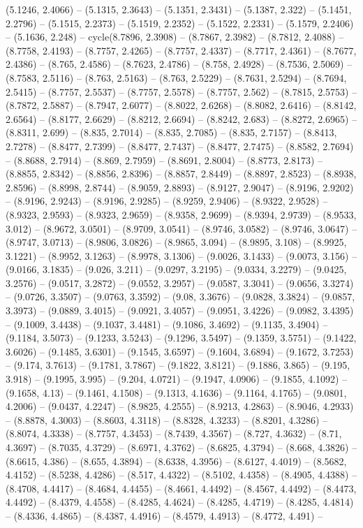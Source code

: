 (5.1246, 2.4066) -- (5.1315, 2.3643) -- (5.1351, 2.3431) -- (5.1387, 2.322) -- (5.1451, 2.2796) -- (5.1515, 2.2373) -- (5.1519, 2.2352) -- (5.1522, 2.2331) -- (5.1579, 2.2406) -- (5.1636, 2.248) -- cycle(8.7896, 2.3908) -- (8.7867, 2.3982) -- (8.7812, 2.4088) -- (8.7758, 2.4193) -- (8.7757, 2.4265) -- (8.7757, 2.4337) -- (8.7717, 2.4361) -- (8.7677, 2.4386) -- (8.765, 2.4586) -- (8.7623, 2.4786) -- (8.758, 2.4928) -- (8.7536, 2.5069) -- (8.7583, 2.5116) -- (8.763, 2.5163) -- (8.763, 2.5229) -- (8.7631, 2.5294) -- (8.7694, 2.5415) -- (8.7757, 2.5537) -- (8.7757, 2.5578) -- (8.7757, 2.562) -- (8.7815, 2.5753) -- (8.7872, 2.5887) -- (8.7947, 2.6077) -- (8.8022, 2.6268) -- (8.8082, 2.6416) -- (8.8142, 2.6564) -- (8.8177, 2.6629) -- (8.8212, 2.6694) -- (8.8242, 2.683) -- (8.8272, 2.6965) -- (8.8311, 2.699) -- (8.835, 2.7014) -- (8.835, 2.7085) -- (8.835, 2.7157) -- (8.8413, 2.7278) -- (8.8477, 2.7399) -- (8.8477, 2.7437) -- (8.8477, 2.7475) -- (8.8582, 2.7694) -- (8.8688, 2.7914) -- (8.869, 2.7959) -- (8.8691, 2.8004) -- (8.8773, 2.8173) -- (8.8855, 2.8342) -- (8.8856, 2.8396) -- (8.8857, 2.8449) -- (8.8897, 2.8523) -- (8.8938, 2.8596) -- (8.8998, 2.8744) -- (8.9059, 2.8893) -- (8.9127, 2.9047) -- (8.9196, 2.9202) -- (8.9196, 2.9243) -- (8.9196, 2.9285) -- (8.9259, 2.9406) -- (8.9322, 2.9528) -- (8.9323, 2.9593) -- (8.9323, 2.9659) -- (8.9358, 2.9699) -- (8.9394, 2.9739) -- (8.9533, 3.012) -- (8.9672, 3.0501) -- (8.9709, 3.0541) -- (8.9746, 3.0582) -- (8.9746, 3.0647) -- (8.9747, 3.0713) -- (8.9806, 3.0826) -- (8.9865, 3.094) -- (8.9895, 3.108) -- (8.9925, 3.1221) -- (8.9952, 3.1263) -- (8.9978, 3.1306) -- (9.0026, 3.1433) -- (9.0073, 3.156) -- (9.0166, 3.1835) -- (9.026, 3.211) -- (9.0297, 3.2195) -- (9.0334, 3.2279) -- (9.0425, 3.2576) -- (9.0517, 3.2872) -- (9.0552, 3.2957) -- (9.0587, 3.3041) -- (9.0656, 3.3274) -- (9.0726, 3.3507) -- (9.0763, 3.3592) -- (9.08, 3.3676) -- (9.0828, 3.3824) -- (9.0857, 3.3973) -- (9.0889, 3.4015) -- (9.0921, 3.4057) -- (9.0951, 3.4226) -- (9.0982, 3.4395) -- (9.1009, 3.4438) -- (9.1037, 3.4481) -- (9.1086, 3.4692) -- (9.1135, 3.4904) -- (9.1184, 3.5073) -- (9.1233, 3.5243) -- (9.1296, 3.5497) -- (9.1359, 3.5751) -- (9.1422, 3.6026) -- (9.1485, 3.6301) -- (9.1545, 3.6597) -- (9.1604, 3.6894) -- (9.1672, 3.7253) -- (9.174, 3.7613) -- (9.1781, 3.7867) -- (9.1822, 3.8121) -- (9.1886, 3.865) -- (9.195, 3.918) -- (9.1995, 3.995) -- (9.204, 4.0721) -- (9.1947, 4.0906) -- (9.1855, 4.1092) -- (9.1658, 4.13) -- (9.1461, 4.1508) -- (9.1313, 4.1636) -- (9.1164, 4.1765) -- (9.0801, 4.2006) -- (9.0437, 4.2247) -- (8.9825, 4.2555) -- (8.9213, 4.2863) -- (8.9046, 4.2933) -- (8.8878, 4.3003) -- (8.8603, 4.3118) -- (8.8328, 4.3233) -- (8.8201, 4.3286) -- (8.8074, 4.3338) -- (8.7757, 4.3453) -- (8.7439, 4.3567) -- (8.727, 4.3632) -- (8.71, 4.3697) -- (8.7035, 4.3729) -- (8.6971, 4.3762) -- (8.6825, 4.3794) -- (8.668, 4.3826) -- (8.6615, 4.386) -- (8.655, 4.3894) -- (8.6338, 4.3956) -- (8.6127, 4.4019) -- (8.5682, 4.4152) -- (8.5238, 4.4286) -- (8.517, 4.4322) -- (8.5102, 4.4358) -- (8.4905, 4.4388) -- (8.4708, 4.4417) -- (8.4684, 4.4455) -- (8.4661, 4.4492) -- (8.4567, 4.4492) -- (8.4473, 4.4492) -- (8.4379, 4.4558) -- (8.4285, 4.4624) -- (8.4285, 4.4719) -- (8.4285, 4.4814) -- (8.4336, 4.4865) -- (8.4387, 4.4916) -- (8.4579, 4.4913) -- (8.4772, 4.491) -- 